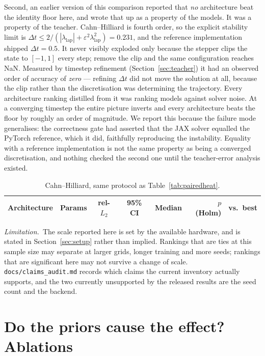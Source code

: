 \documentclass{article}
\newcommand{\code}[1]{\texttt{\small #1}}
\newcommand{\limitation}[1]{\par\smallskip\noindent\textit{Limitation.}~#1\par\smallskip}
\begin{document}
Second, an earlier version of this comparison reported that \emph{no} architecture beat the
identity floor here, and wrote that up as a property of the models. It was a property of
the teacher. Cahn--Hilliard is fourth order, so the explicit stability limit is
$\Delta t \le 2/(|\lambda_{\text{lap}}| + \varepsilon^2\lambda_{\text{lap}}^2) = 0.231$,
and the reference implementation shipped $\Delta t = 0.5$. It never visibly exploded only
because the stepper clips the state to $[-1,1]$ every step; remove the clip and the same
configuration reaches NaN. Measured by timestep refinement (Section~\ref{sec:teacher}) it
had an observed order of accuracy of \emph{zero} --- refining $\Delta t$ did not move the
solution at all, because the clip rather than the discretisation was determining the
trajectory. Every architecture ranking distilled from it was ranking models against solver
noise. At a converging timestep the entire picture inverts and every architecture beats the
floor by roughly an order of magnitude. We report this because the failure mode generalises:
the correctness gate had asserted that the JAX solver equalled the PyTorch reference, which
it did, faithfully reproducing the instability. Equality with a reference implementation is
not the same property as being a converged discretisation, and nothing checked the second
one until the teacher-error analysis existed.

\begin{table}[t]
\centering
\caption{Cahn--Hilliard, same protocol as Table~\ref{tab:pairedheat}.}
\label{tab:pairedch}
\small
\begin{tabular}{lrcccrl}
\toprule
Architecture & Params & rel-$L_2$ & 95\% CI & Median & $p$ (Holm) & vs.\ best \\
\midrule

\bottomrule
\end{tabular}
\end{table}

\limitation{The scale reported here is set by the available hardware, and is stated in
Section~\ref{sec:setup} rather than implied. Rankings that are ties at this sample size
may separate at larger grids, longer training and more seeds; rankings that are
significant here may not survive a change of scale. \code{docs/claims\_audit.md} records
which claims the current inventory actually supports, and the two currently unsupported
by the released results are the seed count and the backend.}

\section{Do the priors cause the effect? Ablations}
\label{sec:ablate}
\end{document}
